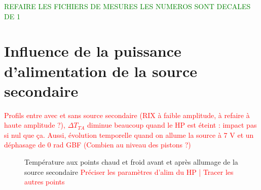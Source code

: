 \textcolor{green}{REFAIRE LES FICHIERS DE MESURES LES NUMEROS SONT DECALES DE 1}

\section{Influence de la puissance d'alimentation de la source secondaire}



\textcolor{red}{Profils entre avec et sans source secondaire (RIX à faible amplitude, à refaire à haute amplitude ?), $\Delta T_{TA}$ diminue beaucoup quand le HP est éteint : impact pas si nul que ça. Aussi, évolution temporelle quand on allume la source à 7 V et un déphasage de 0 rad GBF (Combien au niveau des pistons ?)}


\begin{figure}
    \centering
    
    \caption{Température aux points chaud et froid avant et après allumage de la source secondaire \textcolor{red}{Préciser les paramètres d'alim du HP | Tracer les autres points}}
    \label{fig:GradT_PuissHP}
\end{figure}